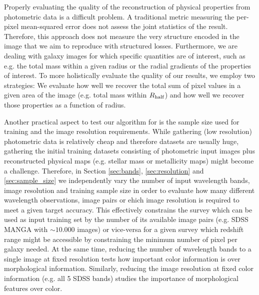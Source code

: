 \documentclass[useAMS,usenatbib]{mnras}
\begin{document}
Properly evaluating the quality of the reconstruction of physical properties from photometric data is a difficult problem. A traditional metric measuring the per-pixel mean-squared error does not assess the joint statistics of the result. Therefore, this approach does not measure the very structure encoded in the image that we aim to reproduce with structured losses. Furthermore, we are dealing with galaxy images for which specific quantities are of interest, such as e.g. the total mass within a given radius or the radial gradients of the properties of interest.
To more holistically evaluate the quality of our results, we employ two strategies: We evaluate how well we recover the total sum of pixel values in a given area of the image (e.g. total mass within $R_{\rm half}$) and how well we recover those properties as a function of radius. 

Another practical aspect to test our algorithm for is the sample size used for training and the image resolution requirements. While gathering (low resolution) photometric data is relatively cheap and therefore datasets are usually huge, gathering the initial training datasets consisting of photometric input images plus reconstructed physical maps (e.g. stellar mass or metallicity maps) might become a challenge. Therefore, in Section \ref{sec:bands},  \ref{sec:resolution} and \ref{sec:sample_size} we independently vary the number of input wavelength bands, image resolution and training sample size in order to evaluate how many different wavelength observations, image pairs or ehich image resolution is required to meet a given target accuracy. This effectively constrains the survey which can be used as input training set by the number of its available image pairs (e.g. SDSS MANGA with $\sim10.000$ images) or vice-versa for a given survey which redshift range might be accessible by constraining the minimum number of pixel per galaxy needed. At the same time, reducing the number of wavelength bands to a single image at fixed resolution tests how important color information is over morphological information. Similarly, reducing the image resolution at fixed color information (e.g. all 5 SDSS bands) studies the importance of morphological features over color.  
\end{document}
